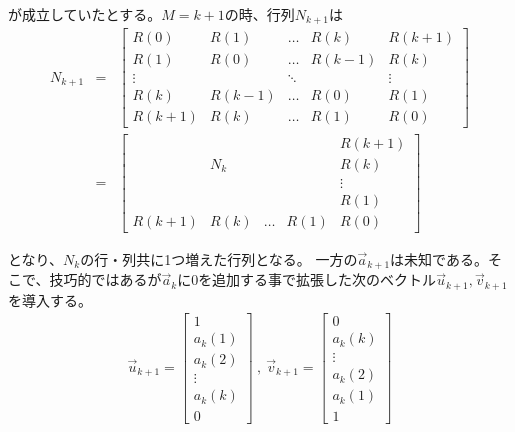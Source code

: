 \documentclass[uplatex,dvipdfmx,b5j,10pt]{jsbook}
\theoremstyle{definition}
\begin{document}
が成立していたとする。$M=k+1$の時、行列$N_{k+1}$は
\begin{eqnarray*}
  N_{k+1}
  &=& 
  \begin{bmatrix}
    R(0) & R(1) & \dots & R(k) & R(k+1)   \\
    R(1) & R(0) & \dots & R(k-1) & R(k) \\
    \vdots &       & \ddots  & & \vdots  \\
    R(k) & R(k-1) & \dots & R(0) & R(1) \\
    R(k+1) & R(k) & \dots & R(1) & R(0) 
  \end{bmatrix} \\
  &=& 
  \left[
    \begin{array}{cccc|c}
      & & & & R(k+1)   \\
      & N_{k} & & & R(k) \\
      & & & & \vdots  \\
      & & & & R(1) \\\hline
      R(k+1) & R(k) & \dots & R(1) & R(0)
    \end{array}
  \right]
\end{eqnarray*}

となり、$N_{k}$の行・列共に1つ増えた行列となる。
一方の$\vec{a}_{k+1}$は未知である。そこで、技巧的ではあるが$\vec{a}_{k}$に$0$を追加する事で拡張した次のベクトル$\vec{u}_{k+1}, \vec{v}_{k+1}$を導入する。
\begin{eqnarray*}
  \vec{u}_{k+1}=
  \begin{bmatrix}
    1 \\ a_{k}(1) \\ a_{k}(2) \\ \vdots \\ a_{k}(k) \\ 0
  \end{bmatrix}\ ,\ 
  \vec{v}_{k+1}=
  \begin{bmatrix}
    0 \\ a_{k}(k) \\ \vdots \\ a_{k}(2) \\ a_{k}(1) \\ 1 
  \end{bmatrix}
\end{eqnarray*}
\end{document}
